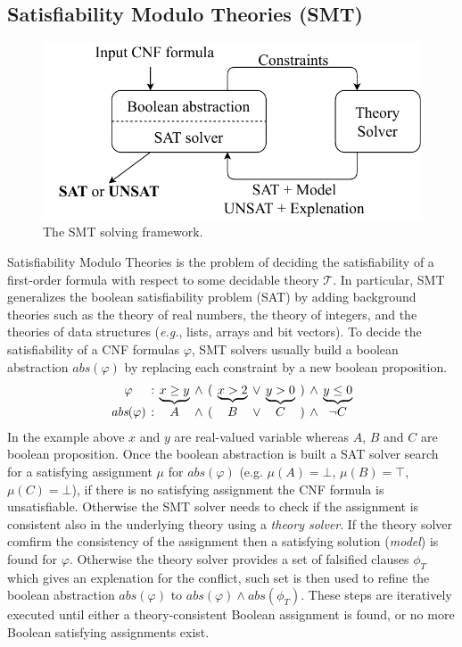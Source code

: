 \subsection{Satisfiability Modulo Theories (SMT)}
\begin{figure}[ht]
    \centering
    \includegraphics{Images/SMT.pdf}
    \caption{The SMT solving framework.}
    \label{fig:smt-frame}
\end{figure}
Satisfiability Modulo Theories is the problem of deciding the satisfiability of a first-order formula with respect to some decidable theory $\mathcal{T}$. In particular, SMT generalizes the boolean satisfiability problem (SAT) by adding background theories such as the theory of real numbers, the theory of integers, and the theories of data structures (\textit{e.g.}, lists, arrays and bit vectors). To decide the satisfiability of a CNF formulas $\varphi$, SMT solvers usually build a boolean abstraction $\textit{abs}(\varphi)$ by replacing each constraint by a new boolean proposition.
\begin{eqnarray*}
\arraycolsep=2pt
\begin{array}{ccccccccccc}
\varphi &: &\underbrace{x \geq y} &\wedge &(&\underbrace{x > 2}& \vee &\underbrace{y >0}&)& \wedge &\underbrace{y \leq 0} \\
\textit{abs}(\varphi)&:&A& \wedge& (&B& \vee &C&)& \wedge  &\neg C
\end{array}
\label{eq:abs}
\end{eqnarray*}
In the example above $x$ and $y$ are real-valued variable whereas $A$, $B$ and $C$ are boolean proposition.
Once the boolean abstraction is built a SAT solver search for a satisfying assignment $\mu$ for $\textit{abs}(\varphi)$ (e.g. $\mu(A) = \bot$, $\mu(B) = \top$, $\mu(C) = \bot$), if there is no satisfying assignment the CNF formula is unsatisfiable. Otherwise the SMT solver needs to check if the assignment is consistent also in the underlying theory using a \textit{theory solver}. If the theory solver comfirm the consistency of the assignment then a satisfying solution (\textit{model}) is found for $\varphi$. Otherwise the theory solver provides a set of falsified clauses $\phi_T$ which gives an explenation for the conflict, such set is then used to refine the boolean abstraction $\textit{abs}(\varphi)$ to $\textit{abs}(\varphi)\wedge \textit{abs}(\phi_T)$. These steps are iteratively executed until either a theory-consistent Boolean assignment is found, or no more Boolean satisfying assignments exist.